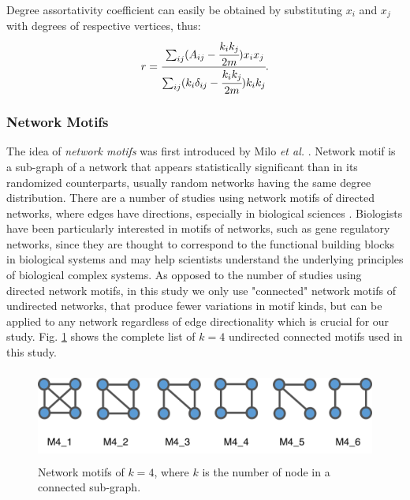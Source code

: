 \documentclass{article}
\begin{document}
Degree assortativity coefficient can easily be obtained by substituting $x_i$ and $x_j$ with degrees of respective vertices, thus:
	\begin{equation}
	 r =  \cfrac{\sum_{ij}(A_{ij} - \cfrac{k_i k_j}{2m})x_i x_j}{\sum_{ij}(k_i \delta_{ij} - \cfrac{k_i k_j}{2m}) k_i k_j}.
	\end{equation}

	\subsubsection{Network Motifs} 
The idea of \textit{network motifs} was first introduced by Milo \textit{et al.} \cite{Milo_motif}. Network motif is a sub-graph of a network that appears statistically significant than in its randomized counterparts, usually random networks having the same degree distribution. There are a number of studies using network motifs of directed networks, where edges have directions, especially in biological sciences \cite{Alon2007, MotifsInBrain, NetworkMotifsEcoli}. Biologists have been particularly interested in motifs of networks, such as gene regulatory networks, since they are thought to correspond to the functional building blocks in biological systems and may help scientists understand the underlying principles of biological complex systems.
As opposed to the number of studies using directed network motifs, in this study we only use "connected" network motifs of undirected networks, that produce fewer variations in motif kinds, but can be applied to any network regardless of edge directionality which is crucial for our study. Fig. \ref{motifs} shows the complete list of $k=4$ undirected connected motifs used in this study.

\begin{figure}[ht]
	\begin{center}
		\vspace{0.5cm}
		\includegraphics[clip,width=12cm,height = 3cm]{figs/motifs.png}
		\vspace{0.5cm}
		\caption{Network motifs of $k =4$, where $k$ is the number of node in a connected sub-graph.}
		\label{motifs}
	\end{center}
\end{figure}
\end{document}
